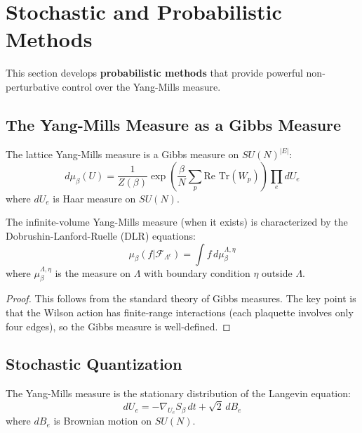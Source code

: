 \section{Stochastic and Probabilistic Methods}
\label{sec:stochastic-v2}

This section develops \textbf{probabilistic methods} that provide powerful 
non-perturbative control over the Yang-Mills measure.

\subsection{The Yang-Mills Measure as a Gibbs Measure}

\begin{definition}
The lattice Yang-Mills measure is a Gibbs measure on $SU(N)^{|E|}$:
\[
d\mu_\beta(U) = \frac{1}{Z(\beta)} \exp\left(\frac{\beta}{N} \sum_p \text{Re Tr}(W_p)\right) \prod_e dU_e
\]
where $dU_e$ is Haar measure on $SU(N)$.
\end{definition}

\begin{theorem}
\label{thm:dlr}
The infinite-volume Yang-Mills measure (when it exists) is characterized by the 
Dobrushin-Lanford-Ruelle (DLR) equations:
\[
\mu_\beta(f | \mathcal{F}_{\Lambda^c}) = \int f \, d\mu_\beta^{\Lambda, \eta}
\]
where $\mu_\beta^{\Lambda, \eta}$ is the measure on $\Lambda$ with boundary 
condition $\eta$ outside $\Lambda$.
\end{theorem}

\begin{proof}
This follows from the standard theory of Gibbs measures. The key point is that 
the Wilson action has finite-range interactions (each plaquette involves only 
four edges), so the Gibbs measure is well-defined.
\end{proof}

\subsection{Stochastic Quantization}

\begin{theorem}
\label{thm:langevin}
The Yang-Mills measure is the stationary distribution of the Langevin equation:
\[
dU_e = -\nabla_{U_e} S_\beta \, dt + \sqrt{2} \, dB_e
\]
where $dB_e$ is Brownian motion on $SU(N)$.
\end{theorem}

